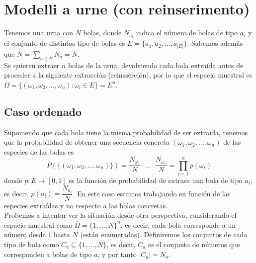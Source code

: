 \section{Modelli a urne (con reinserimento)}
Tenemos una urna con $N$ bolas, donde $N_{a_i}$ indica el número de bolas de tipo $a_i$ y el conjunto de distintos tipo de bolas es $E=\{a_1, a_2, \ldots, a_{|E|}\}$. Sabemos además que $N=\sum\limits_{a\in E} N_{a} = N$. \\
Se quieren extraer $n$ bolas de la urna, devolviendo cada bola extraída antes de proceder a la siguiente extracción (reinsserción), por lo que el espacio muestral es \mbox{$\Omega= \{(\omega_1, \omega_2, \ldots, \omega_n): \omega_i \in E\}$}$= E^n$. \\

\subsection{Caso ordenado}
\noindent
Suponiendo que cada bola tiene la misma probabilidad de ser extraída, tenemos que la probabilidad de obtener una secuencia concreta $(\omega_1, \omega_2, \ldots, \omega_n)$ de las especies de las bolas es
\begin{equation*}
    P(\{(\omega_1, \omega_2, \ldots, \omega_n)\}) = \dfrac{N_{\omega_1}}{N} \cdot \ldots \cdot \dfrac{N_{\omega_n}}{N} = \prod_{i=1}^n p(\omega_i)
\end{equation*}
donde $p:E\to [0,1]$ es la función de probabilidad de extraer una bola de tipo $a_i$, es decir, $p(a_i) = \dfrac{N_{a_i}}{N}$. En este caso estamos trabajando en función de las especies extraídas y no respecto a las bolas concretas.\\ 

\noindent
Probemos a intentar ver la situación desde otra perspectiva, considerando el espacio muestral como $\overline{\Omega}=\{1, \dots, N\}^n$, es decir, cada bola corresponde a un número desde $1$ hasta $N$ (están enumeradas). Definiremos los conjuntos de cada tipo de bola como $C_a\subseteq \{1, \ldots, N\}$, es decir, $C_a$ es el conjunto de números que corresponden a bolas de tipo $a$, y por tanto $|C_a|=N_a$. \\


